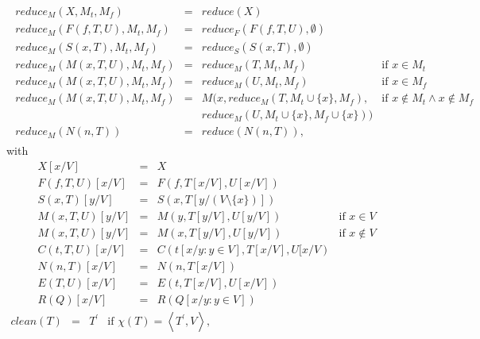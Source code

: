 \documentclass{article}
\begin{document}
\begin{equation*}
\begin{array}{l}
\begin{array}{llll}
reduce_{M}(X,M_{t},M_{f}) & = & reduce(X) &  \\ 
reduce_{M}(F(f,T,U),M_{t},M_{f}) & = & reduce_{F}(F(f,T,U),\emptyset ) &  \\ 
reduce_{M}(S(x,T),M_{t},M_{f}) & = & reduce_{S}(S(x,T),\emptyset ) &  \\ 
reduce_{M}(M(x,T,U),M_{t},M_{f}) & = & reduce_{M}(T,M_{t},M_{f}) & \text{if }%
x\in M_{t} \\ 
reduce_{M}(M(x,T,U),M_{t},M_{f}) & = & reduce_{M}(U,M_{t},M_{f}) & \text{if }%
x\in M_{f} \\ 
reduce_{M}(M(x,T,U),M_{t},M_{f}) & = & M(x,reduce_{M}(T,M_{t}\cup
\{x\},M_{f}), & \text{if }x\notin M_{t}\wedge x\notin M_{f} \\ 
&  & reduce_{M}(U,M_{t}\cup \{x\},M_{f}\cup \{x\})) &  \\ 
reduce_{M}(N(n,T)) & = & reduce(N(n,T)), & 
\end{array}%
\end{array}%
\end{equation*}%
with%
\begin{equation*}
\begin{array}{llll}
X[x/V] & = & X &  \\ 
F(f,T,U)[x/V] & = & F(f,T[x/V],U[x/V]) &  \\ 
S(x,T)[y/V] & = & S(x,T[y/(V\setminus \{x\})]) &  \\ 
M(x,T,U)[y/V] & = & M(y,T[y/V],U[y/V]) & \text{if }x\in V \\ 
M(x,T,U)[y/V] & = & M(x,T[y/V],U[y/V]) & \text{if }x\notin V \\ 
C(t,T,U)[x/V] & = & C(t[x/y:y\in V],T[x/V],U[x/V) &  \\ 
N(n,T)[x/V] & = & N(n,T[x/V]) &  \\ 
E(T,U)[x/V] & = & E(t,T[x/V],U[x/V]) &  \\ 
R(Q)[x/V] & = & R(Q[x/y:y\in V]) & 
\end{array}%
\end{equation*}%
$%
\begin{array}{llll}
clean(T) & = & T^{\prime } & \text{if }\chi (T)=\left\langle T^{\prime
},V\right\rangle ,%
\end{array}%
$
\end{document}
